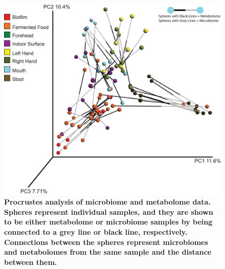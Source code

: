 \begin{figure}[htbp]
\includegraphics[width=\columnwidth]{chapter_48_hours_figures/F5.jpg}
\caption[Procrustes analysis of microbiome and metabolome data. Spheres represent individual samples, and they are shown to be either metabolome or microbiome samples by being connected to a grey line or black line, respectively. Connections between the spheres represent microbiomes and metabolomes from the same sample and the distance between them]{\textbf{Procrustes analysis of microbiome and metabolome data. Spheres represent individual samples, and they are shown to be either metabolome or microbiome samples by being connected to a grey line or black line, respectively. Connections between the spheres represent microbiomes and metabolomes from the same sample and the distance between them.}}
\label{rrfigure5}
\end{figure}

